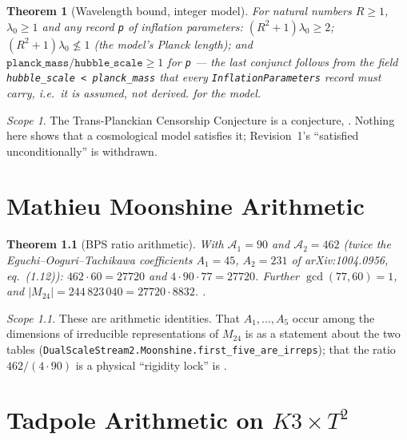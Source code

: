 \documentclass[11pt,a4paper]{report}
\newtheorem{theorem}{Theorem}[chapter]
\theoremstyle{remark}
\newtheorem*{scope}{Scope}
\begin{document}
\begin{theorem}[Wavelength bound, integer model]\label{thm:tcc_resolution}
\leanok
{}
For natural numbers $R\ge1$, $\lambda_0\ge1$ and any record \texttt{p} of inflation parameters:
$(R^2+1)\lambda_0\ge2$; $(R^2+1)\lambda_0\not\le1$ (the model's Planck length); and
$\texttt{planck\_mass}/\texttt{hubble\_scale}\ge1$ for \texttt{p} --- the last conjunct follows from the field
\texttt{hubble\_scale < planck\_mass} that every \texttt{InflationParameters} record must carry, i.e.\ it is
assumed, not derived. \TA{} for the model.
\end{theorem}
\begin{scope}
The Trans-Planckian Censorship Conjecture is a conjecture, \TC{}. Nothing here shows that a cosmological
model satisfies it; Revision~1's ``satisfied unconditionally'' is withdrawn.
\end{scope}

\chapter{Mathieu Moonshine Arithmetic}

\begin{theorem}[BPS ratio arithmetic]\label{thm:mathieu_rigidity}
\leanok
With $\mathcal{A}_1=90$ and $\mathcal{A}_2=462$ (twice the Eguchi--Ooguri--Tachikawa coefficients
$A_1=45$, $A_2=231$ of arXiv:1004.0956, eq.~(1.12)): $462\cdot60=27720$ and $4\cdot90\cdot77=27720$. Further
\leanok
$\gcd(77,60)=1$, and
\leanok
$|M_{24}|=244\,823\,040=27720\cdot8832$. \TA{}.
\end{theorem}
\begin{scope}
These are arithmetic identities. That $A_1,\dots,A_5$ occur among the dimensions of irreducible
representations of $M_{24}$ is \TA{} as a statement about the two tables
(\texttt{DualScaleStream2.Moonshine.first\_five\_are\_irreps}); that the ratio $462/(4\cdot90)$ is a
physical ``rigidity lock'' is \TC{}.
\end{scope}

\chapter{Tadpole Arithmetic on $K3\times T^2$}
\end{document}
